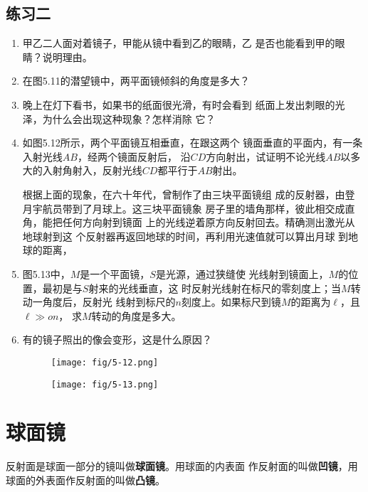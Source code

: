 \subsection*{练习二}
\begin{enumerate}
    \item 甲乙二人面对着镜子，甲能从镜中看到乙的眼睛，乙
    是否也能看到甲的眼睛？说明理由。
    \item 在图5.11的潜望镜中，两平面镜倾斜的角度是多大？
    \item 晚上在灯下看书，如果书的纸面很光滑，有时会看到
    纸面上发出刺眼的光泽，为什么会出现这种现象？怎样消除
    它？
    \item 如图5.12所示，两个平面镜互相垂直，在跟这两个
    镜面垂直的平面内，有一条入射光线$AB$，经两个镜面反射后，
    沿$CD$方向射出，试证明不论光线$AB$以多大的入射角射入，反射光线$CD$都平行于$AB$射出。
    
    根据上面的现象，在六十年代，曾制作了由三块平面镜组
    成的反射器，由登月宇航员带到了月球上。这三块平面镜象
    房子里的墙角那样，彼此相交成直角，能把任何方向射到镜面
    上的光线逆着原方向反射回去。精确测出激光从地球射到这
    个反射器再返回地球的时间，再利用光速值就可以算出月球
    到地球的距离，
    \item 图5.13中，$M$是一个平面镜，$S$是光源，通过狭缝使
    光线射到镜面上，$M$的位置，最初是与$S$射来的光线垂直，这
    时反射光线射在标尺的零刻度上；当$M$转动一角度后，反射光
    线射到标尺的$n$刻度上。如果标尺到镜$M$的距离为$\ell$，且$\ell\gg on$，
    求$M$转动的角度是多大。
    \item 有的镜子照出的像会变形，这是什么原因？
    \begin{figure}[htp]
        \centering
        \begin{minipage}[t]{0.48\textwidth}
        \centering
        \texttt{[image: fig/5-12.png]}
        \caption{}
        \end{minipage}
        \begin{minipage}[t]{0.48\textwidth}
        \centering
        \texttt{[image: fig/5-13.png]}
        \caption{}
        \end{minipage}
        \end{figure}
\end{enumerate}
    
\section{球面镜}
反射面是球面一部分的镜叫做\textbf{球面镜}。用球面的内表面
作反射面的叫做\textbf{凹镜}，用球面的外表面作反射面的叫做\textbf{凸镜}。

